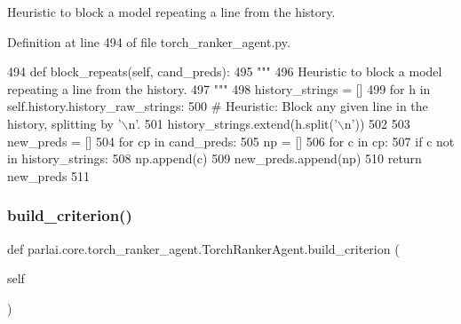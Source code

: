 \begin{DoxyVerb}Heuristic to block a model repeating a line from the history.
\end{DoxyVerb}
 

Definition at line 494 of file torch\+\_\+ranker\+\_\+agent.\+py.


\begin{DoxyCode}
494     \textcolor{keyword}{def }block\_repeats(self, cand\_preds):
495         \textcolor{stringliteral}{"""}
496 \textcolor{stringliteral}{        Heuristic to block a model repeating a line from the history.}
497 \textcolor{stringliteral}{        """}
498         history\_strings = []
499         \textcolor{keywordflow}{for} h \textcolor{keywordflow}{in} self.history.history\_raw\_strings:
500             \textcolor{comment}{# Heuristic: Block any given line in the history, splitting by '\(\backslash\)n'.}
501             history\_strings.extend(h.split(\textcolor{stringliteral}{'\(\backslash\)n'}))
502 
503         new\_preds = []
504         \textcolor{keywordflow}{for} cp \textcolor{keywordflow}{in} cand\_preds:
505             np = []
506             \textcolor{keywordflow}{for} c \textcolor{keywordflow}{in} cp:
507                 \textcolor{keywordflow}{if} c \textcolor{keywordflow}{not} \textcolor{keywordflow}{in} history\_strings:
508                     np.append(c)
509             new\_preds.append(np)
510         \textcolor{keywordflow}{return} new\_preds
511 
\end{DoxyCode}
\mbox{\label{classparlai_1_1core_1_1torch__ranker__agent_1_1TorchRankerAgent_a16d004a75c5fee42cd13db4abe157b98}} 
\subsubsection{\texorpdfstring{build\+\_\+criterion()}{build\_criterion()}}
{\footnotesize\ttfamily def parlai.\+core.\+torch\+\_\+ranker\+\_\+agent.\+Torch\+Ranker\+Agent.\+build\+\_\+criterion (\begin{DoxyParamCaption}\item[{}]{self }\end{DoxyParamCaption})}

